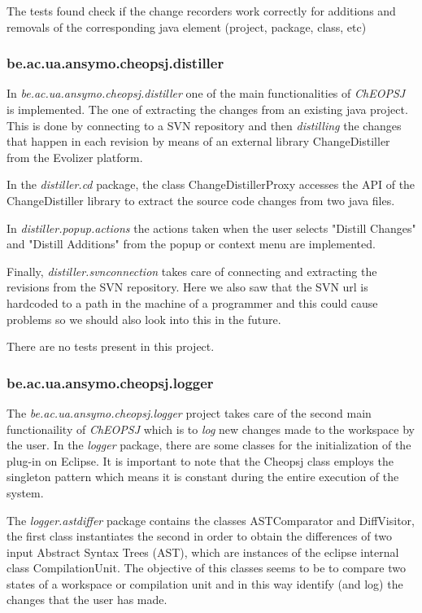 \documentclass{article}
\begin{document}
The tests found check if the change recorders work correctly for additions and removals of the corresponding java element (project, package, class, etc)

\subsubsection{be.ac.ua.ansymo.cheopsj.distiller}
In \emph{be.ac.ua.ansymo.cheopsj.distiller} one of the main functionalities of \emph{ChEOPSJ} is implemented. The one of extracting the changes from an existing java project. This is done by connecting to a SVN repository and then \emph{distilling} the changes that happen in each revision by means of an external library ChangeDistiller from the Evolizer platform.

In the \emph{distiller.cd} package, the class ChangeDistillerProxy accesses the API of the ChangeDistiller library to extract the source code changes from two java files.

In \emph{distiller.popup.actions} the actions taken when the user selects "Distill Changes" and "Distill Additions" from the popup or context menu are implemented. 

Finally, \emph{distiller.svnconnection} takes care of connecting and extracting the revisions from the SVN repository. Here we also saw that the SVN url is hardcoded to a path in the machine of a programmer and this could cause problems so we should also look into this in the future.

There are no tests present in this project.

\subsubsection{be.ac.ua.ansymo.cheopsj.logger}
The \emph{be.ac.ua.ansymo.cheopsj.logger} project takes care of the second main functionaility of \emph{ChEOPSJ} which is to \emph{log} new changes made to the workspace by the user. In the \emph{logger} package, there are some classes for the initialization of the plug-in on Eclipse. It is important to note that the Cheopsj class employs the singleton pattern which means it is constant during the entire execution of the system.

The \emph{logger.astdiffer} package contains the classes ASTComparator and DiffVisitor, the first class instantiates the second in order to obtain the differences of two input Abstract Syntax Trees (AST), which are instances of the eclipse internal class CompilationUnit. The objective of this classes seems to be to compare two states of a workspace or compilation unit and in this way identify (and log) the changes that the user has made.
\end{document}
